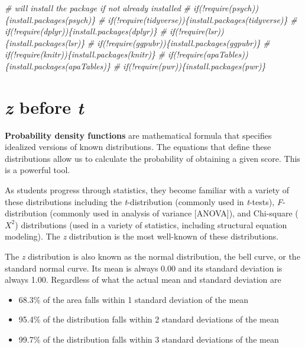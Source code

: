 \documentclass[
  11pt,
]{book}
\newenvironment{Shaded}{\begin{snugshade}}{\end{snugshade}}
\newcommand{\CommentTok}[1]{\textcolor[rgb]{0.56,0.35,0.01}{\textit{#1}}}
\providecommand{\tightlist}{%
  \setlength{\itemsep}{0pt}\setlength{\parskip}{0pt}}
\begin{document}
\begin{Shaded}
\begin{Highlighting}[]
\CommentTok{\# will install the package if not already installed}
\CommentTok{\# if(!require(psych))\{install.packages(\textquotesingle{}psych\textquotesingle{})\}}
\CommentTok{\# if(!require(tidyverse))\{install.packages(\textquotesingle{}tidyverse\textquotesingle{})\}}
\CommentTok{\# if(!require(dplyr))\{install.packages(\textquotesingle{}dplyr\textquotesingle{})\}}
\CommentTok{\# if(!require(lsr))\{install.packages(\textquotesingle{}lsr\textquotesingle{})\}}
\CommentTok{\# if(!require(ggpubr))\{install.packages(\textquotesingle{}ggpubr\textquotesingle{})\}}
\CommentTok{\# if(!require(knitr))\{install.packages(\textquotesingle{}knitr\textquotesingle{})\}}
\CommentTok{\# if(!require(apaTables))\{install.packages(\textquotesingle{}apaTables\textquotesingle{})\}}
\CommentTok{\# if(!require(pwr))\{install.packages(\textquotesingle{}pwr\textquotesingle{})\}}
\end{Highlighting}
\end{Shaded}

\hypertarget{z-before-t}{%
\section{\texorpdfstring{\emph{z} before \emph{t}}{z before t}}\label{z-before-t}}

\textbf{Probability density functions} are mathematical formula that specifies idealized versions of known distributions. The equations that define these distributions allow us to calculate the probability of obtaining a given score. This is a powerful tool.

As students progress through statistics, they become familiar with a variety of these distributions including the \emph{t}-distribution (commonly used in \emph{t}-tests), \emph{F}-distribution (commonly used in analysis of variance {[}ANOVA{]}), and Chi-square (\(X^2\)) distributions (used in a variety of statistics, including structural equation modeling). The \emph{z} distribution is the most well-known of these distributions.

The \emph{z} distribution is also known as the normal distribution, the bell curve, or the standard normal curve. Its mean is always 0.00 and its standard deviation is always 1.00. Regardless of what the actual mean and standard deviation are

\begin{itemize}
\tightlist
\item
  68.3\% of the area falls within 1 standard deviation of the mean
\item
  95.4\% of the distribution falls within 2 standard deviations of the mean
\item
  99.7\% of the distribution falls within 3 standard deviations of the mean
\end{itemize}
\end{document}
